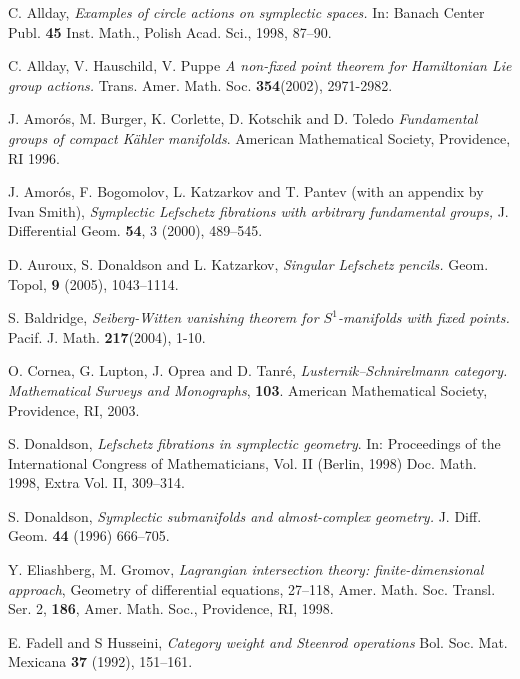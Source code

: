 \documentclass[12pt]{amsart}
\numberwithin{equation}{section}
\theoremstyle{definition}
\theoremstyle{remark}
\numberwithin{figure}{section}
\numberwithin{table}{section}
\begin{document}
 
\begin{thebibliography}{ABCDE} 
 
 C. Allday, {\em Examples of circle actions on symplectic  
spaces.}  
In: Banach Center Publ. {\bf 45} Inst. Math., Polish Acad. Sci., 1998, 87--90. 
 
 C. Allday, V. Hauschild, V. Puppe {\em A non-fixed point 
theorem for Hamiltonian Lie group actions.}  
Trans. Amer. Math. Soc. {\bf 354}(2002), 2971-2982. 
 
J. Amor\'os, M. Burger, K. Corlette, D. Kotschik and D. Toledo 
{\it Fundamental groups of compact K\"ahler manifolds}. American 
Mathematical  Society, Providence, RI 1996. 
 
J. Amor{\'o}s, F. Bogomolov, L. Katzarkov and T. Pantev (with an appendix 
by Ivan Smith), {\em Symplectic Lefschetz fibrations with arbitrary 
fundamental groups,} J. Differential Geom. {\bf 54}, 3 (2000), 489--545. 
 
D. Auroux,  S. Donaldson and L. Katzarkov, {\em Singular Lefschetz pencils.} 
Geom. Topol, {\bf 9} (2005), 1043--1114. 
 
 S. Baldridge, {\em Seiberg-Witten vanishing theorem for 
$S^1$-manifolds with fixed points.}   
Pacif. J. Math. {\bf 217}(2004), 1-10. 
 
O. Cornea, G. Lupton, J. Oprea and D. Tanr\'e, 
{\em Lusternik--Schnirelmann category.  Mathematical Surveys and 
Monographs}, \textbf{103}.  American Mathematical Society, Providence, 
RI, 2003. 
 
S. Donaldson, {\em Lefschetz fibrations in symplectic geometry}. 
In: Proceedings of the International Congress of Mathematicians, Vol. II  
(Berlin, 
1998) 
Doc. Math. 1998, Extra Vol. II, 309--314. 
 
S. Donaldson, {\em Symplectic submanifolds and almost-complex geometry.} 
J. Diff. Geom. {\bf 44} (1996) 666--705. 
 
 Y. Eliashberg, M. Gromov, {\em Lagrangian intersection theory: 
finite-dimensional 
approach},  Geometry of differential equations,  27--118, Amer. Math. Soc. 
Transl. Ser. 2, 
{\bf 186}, Amer. Math. Soc., Providence, RI, 1998.
 
E. Fadell and S Husseini, {\em Category weight and Steenrod operations} 
Bol.  Soc. Mat. Mexicana {\bf 37} (1992), 151--161.  
 

\end{thebibliography}
\end{document}
